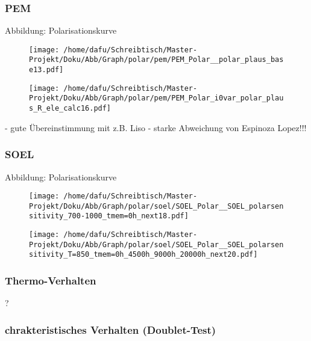 \documentclass[onecolumn,10pt,titlepage]{article}
\begin{document}
\subsubsection*{PEM}
Abbildung: Polarisationskurve
\begin{figure}[!tbp]
	\centering
	\begin{minipage}[b]{0.49\textwidth}
		\texttt{[image: /home/dafu/Schreibtisch/Master-Projekt/Doku/Abb/Graph/polar/pem/PEM\_Polar\_\_polar\_plaus\_base13.pdf]}
		
		\caption{ }
		\label{fig:polk_PEM_Tvar} 
	\end{minipage}
	\hfill
	\begin{minipage}[b]{0.49\textwidth}
		\texttt{[image: /home/dafu/Schreibtisch/Master-Projekt/Doku/Abb/Graph/polar/pem/PEM\_Polar\_i0var\_polar\_plaus\_R\_ele\_calc16.pdf]}
		\caption{ }
		\label{fig:polk_PEM_i0var} 
	\end{minipage}
\end{figure}

- gute Übereinstimmung mit z.B. Liso
- starke Abweichung von Espinoza Lopez!!!


\subsubsection*{SOEL}
Abbildung: Polarisationskurve

\begin{figure}[!tbp]
	\centering
	\begin{minipage}[b]{0.49\textwidth}
		\texttt{[image: /home/dafu/Schreibtisch/Master-Projekt/Doku/Abb/Graph/polar/soel/SOEL\_Polar\_\_SOEL\_polarsensitivity\_700-1000\_tmem=0h\_next18.pdf]}
		
		\caption{ }
		\label{fig:polk_SOEL_Tvar} 
	\end{minipage}
	\hfill
	\begin{minipage}[b]{0.49\textwidth}
		\texttt{[image: /home/dafu/Schreibtisch/Master-Projekt/Doku/Abb/Graph/polar/soel/SOEL\_Polar\_\_SOEL\_polarsensitivity\_T=850\_tmem=0h\_4500h\_9000h\_20000h\_next20.pdf]}
		\caption{ }
		\label{fig:polk_SOEL_i0var} 
	\end{minipage}
\end{figure}



\subsubsection{Thermo-Verhalten}
?
\subsubsection{chrakteristisches Verhalten (Doublet-Test)}
\end{document}
